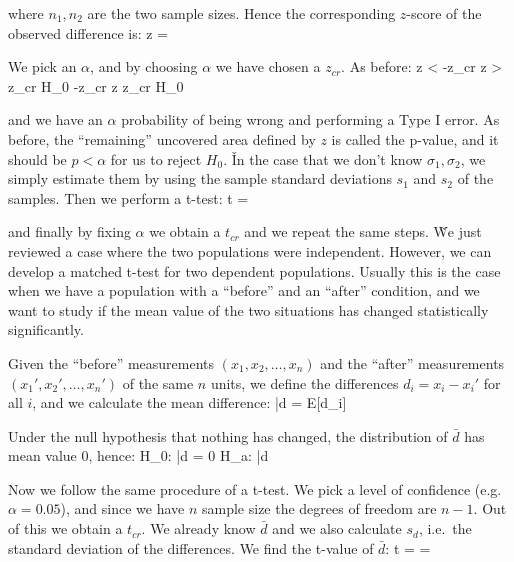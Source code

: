where $n_{1}, n_{2}$ are the two sample sizes. Hence the corresponding $z$-score of the observed difference is:
\bse
z = 
\ese

We pick an $\alpha$, and by choosing $\alpha$ we have chosen a $z_{cr}$. As before:
\bse
z < -z_{cr} \:\:  \:\: z > z_{cr} \imp {} H_{0} \qquad \qquad
-z_{cr} \leq z \leq z_{cr} \imp {} H_{0}
\ese

and we have an $\alpha$ probability of being wrong and performing a Type I error. As before, the ``remaining''
uncovered area defined by $z$ is called the p-value, and it should be $p < \alpha$ for us to reject $H_{0}$. \v

In the case that we don't know $\sigma_{1}, \sigma_{2}$, we simply estimate them by using the sample standard
deviations $s_{1}$ and $s_{2}$ of the samples. Then we perform a t-test:
\bse
t = 
\ese

and finally by fixing $\alpha$ we obtain a $t_{cr}$ and we repeat the same steps. \v

We just reviewed a case where the two populations were independent. However, we can develop a matched t-test for
two dependent populations. Usually this is the case when we have a population with a ``before'' and an ``after''
condition, and we want to study if the mean value of the two situations has changed statistically significantly.


Given the ``before'' measurements $(x_{1}, x_{2}, \ldots, x_{n})$ and the ``after'' measurements
$(x_{1}', x_{2}', \ldots, x_{n}')$ of the same $n$ units, we define the differences $d_{i} = x_{i} - x_{i}'$ for
all $i$, and we calculate the mean difference:
\bse
\bar{d} = E[d_{i}]
\ese

Under the null hypothesis that nothing has changed, the distribution of $\bar{d}$ has mean value 0, hence:
\bse
H_{0}: \bar{d} = 0 \qquad \qquad H_{a}: \bar{d} 
\ese

Now we follow the same procedure of a t-test. We pick a level of confidence (e.g.\ $\alpha = 0.05$), and since we
have $n$ sample size the degrees of freedom are $n-1$. Out of this we obtain a $t_{cr}$. We already know $\bar{d}$
and we also calculate $s_{d}$, i.e.\ the standard deviation of the differences. We find the t-value of $\bar{d}$:
\bse
t =  = 
\ese

